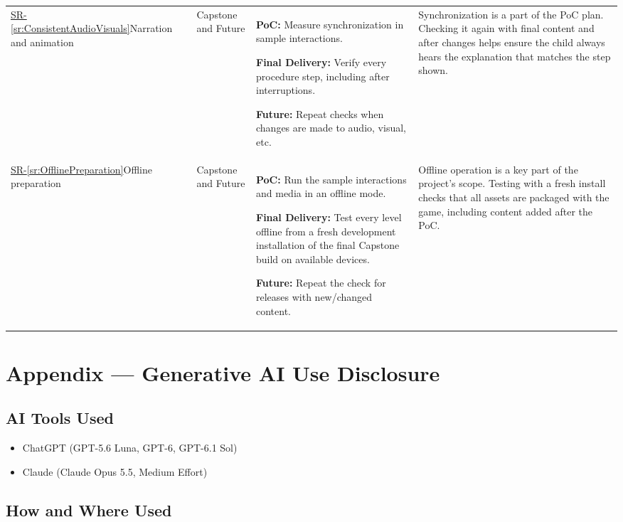 \documentclass{article}
\newcounter{sr}
\newcommand{\srref}[1]{\hyperref[sr:#1]{SR-\ref*{sr:#1}}}
\begin{document}
\begin{longtable}{@{}L{0.20\textwidth}L{0.16\textwidth}L{0.27\textwidth}L{\tabcolsep\relax}@{}}
\srref{ConsistentAudioVisuals}\newline Narration and animation
& Capstone and Future
& \textbf{PoC:} Measure synchronization in sample interactions.

  \textbf{Final Delivery:} Verify every procedure step, including after interruptions.

  \textbf{Future:} Repeat checks when changes are made to audio, visual, etc.
& Synchronization is a part of the PoC plan. Checking it again with
  final content and after changes helps ensure the child always hears the
  explanation that matches the step shown.\\
\addlinespace

\srref{OfflinePreparation}\newline Offline preparation
& Capstone and Future
& \textbf{PoC:} Run the sample interactions and media in an offline mode.

  \textbf{Final Delivery:} Test every level offline from a fresh development
  installation of the final Capstone build on available devices.

  \textbf{Future:} Repeat the check for releases with new/changed content.
& Offline operation is a key part of the project's scope. Testing with a fresh install checks that all assets are packaged with
the game, including content added after the PoC.\\
\end{longtable}
\endgroup

\newpage{}

\section{Appendix --- Generative AI Use Disclosure}

\subsection{AI Tools Used}

\begin{itemize}
  \item ChatGPT (GPT-5.6 Luna, GPT-6, GPT-6.1 Sol)
  \item Claude (Claude Opus 5.5, Medium Effort)
\end{itemize}

\subsection{How and Where Used}
\end{document}
